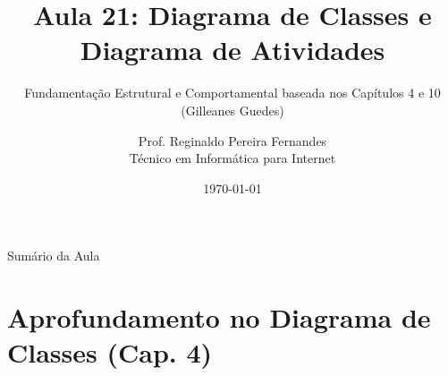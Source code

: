 \documentclass[10pt]{beamer}
\title[IFCE Tauá - Engenharia de Software]{Aula 21: Diagrama de Classes e Diagrama de Atividades}
\subtitle{Fundamentação Estrutural e Comportamental baseada nos Capítulos 4 e 10 (Gilleanes Guedes)}
\author[Prof. Reginaldo Fernandes]{Prof. Reginaldo Pereira Fernandes\texorpdfstring{\\ \small{Técnico em Informática para Internet}}{}}
\institute[IFCE]{Instituto Federal do Ceará -- Campus Tauá}
\date{\today}
\begin{document}
\begin{frame}
    \titlepage
\end{frame}

\begin{frame}{Sumário da Aula}
    \tableofcontents
\end{frame}

\section{Aprofundamento no Diagrama de Classes (Cap. 4)}
\end{document}

